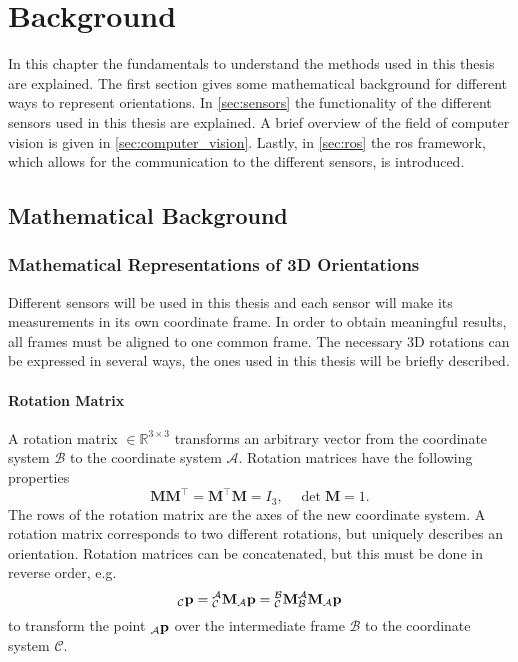 \chapter{Background}
\label{ch:Background}

In this chapter the fundamentals to understand the methods used in this thesis are explained.
The first section gives some mathematical background for different ways to represent orientations.
In \cref{sec:sensors} the functionality of the different sensors used in this thesis are explained.
A brief overview of the field of computer vision is given in \cref{sec:computer_vision}.
Lastly, in \cref{sec:ros} the \gls{ros} framework, which allows for the communication to the different sensors, is introduced.


\section{Mathematical Background}
\subsection{Mathematical Representations of 3D Orientations}
Different sensors will be used in this thesis and each sensor will make its measurements in its own coordinate frame.
In order to obtain meaningful results, all frames must be aligned to one common frame.
The necessary 3D rotations can be expressed in several ways, the ones used in this thesis will be briefly described.

\subsubsection{Rotation Matrix}
A rotation matrix  $\in \mathbb{R}^{3\times3}$ transforms an arbitrary vector from the coordinate system $\mathcal{B}$ to the coordinate system $\mathcal{A}$.
Rotation matrices have the following properties
\begin{equation}
    \mathbf{M}\mathbf{M}^\intercal = \mathbf{M}^\intercal \mathbf{M} = I_3, \quad \det \mathbf{M} = 1.
\end{equation}
The rows of the rotation matrix are the axes of the new coordinate system.
A rotation matrix corresponds to two different rotations, but uniquely describes an orientation.
Rotation matrices can be concatenated, but this must be done in reverse order, e.g.
\begin{equation}
    {}_\mathcal{C}\vb{p} = \mtf{a}{c}{}_\mathcal{A}\vb{p} = \mtf{b}{c}\mtf{a}{b}{}_\mathcal{A}\vb{p}
\end{equation}
to transform the point ${}_\mathcal{A}\vb{p}$ over the intermediate frame $\mathcal{B}$ to the coordinate system $\mathcal{C}$.

